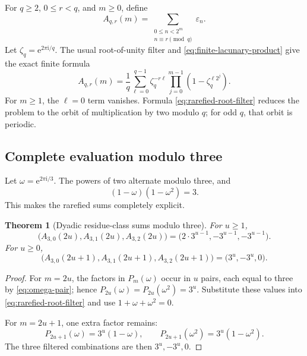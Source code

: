 \documentclass[11pt,oneside]{article}
\newtheorem{theorem}{Theorem}[section]
\theoremstyle{definition}
\theoremstyle{remark}
\newcommand{\e}{\mathrm e}
\newcommand{\ii}{\mathrm i}
\newcommand{\eps}{\varepsilon}
\begin{document}
For \(q\ge2\), \(0\le r<q\), and \(m\ge0\), define
\begin{equation}
  A_{q,r}(m)=\sum_{\substack{0\le n<2^m\\n\equiv r\pmod q}}\eps_n.             \label{eq:rarefied-def}
\end{equation}
Let \(\zeta_q=\e^{2\pi\ii/q}\).  The usual root-of-unity filter and
\eqref{eq:finite-lacunary-product} give the exact finite formula
\begin{equation}
  \boxed{
  A_{q,r}(m)=\frac1q\sum_{\ell=0}^{q-1}\zeta_q^{-r\ell}
   \prod_{j=0}^{m-1}\left(1-\zeta_q^{\ell2^j}\right).}      \label{eq:rarefied-root-filter}
\end{equation}
For \(m\ge1\), the \(\ell=0\) term vanishes.  Formula
\eqref{eq:rarefied-root-filter} reduces the problem to the orbit of multiplication by two
modulo \(q\); for odd \(q\), that orbit is periodic.

\subsection{Complete evaluation modulo three}

Let \(\omega=\e^{2\pi\ii/3}\).  The powers of two alternate modulo three, and
\begin{equation}
  (1-\omega)(1-\omega^2)=3.                                \label{eq:omega-pair}
\end{equation}
This makes the rarefied sums completely explicit.

\begin{theorem}[Dyadic residue-class sums modulo three]
\label{thm:mod3-rarefied}
For \(u\ge1\),
\begin{equation}
  \boxed{
  \bigl(A_{3,0}(2u),A_{3,1}(2u),A_{3,2}(2u)\bigr)
   =\bigl(2\cdot3^{u-1},-3^{u-1},-3^{u-1}\bigr).}          \label{eq:mod3-even-level}
\end{equation}
For \(u\ge0\),
\begin{equation}
  \boxed{
  \bigl(A_{3,0}(2u+1),A_{3,1}(2u+1),A_{3,2}(2u+1)\bigr)
   =\bigl(3^u,-3^u,0\bigr).}                               \label{eq:mod3-odd-level}
\end{equation}
\end{theorem}

\begin{proof}
For \(m=2u\), the factors in \(P_m(\omega)\) occur in \(u\) pairs, each equal to three by
\eqref{eq:omega-pair}; hence
\(P_{2u}(\omega)=P_{2u}(\omega^2)=3^u\).  Substitute these values into
\eqref{eq:rarefied-root-filter} and use \(1+\omega+\omega^2=0\).

For \(m=2u+1\), one extra factor remains:
\[
  P_{2u+1}(\omega)=3^u(1-\omega),
  \qquad
  P_{2u+1}(\omega^2)=3^u(1-\omega^2).
\]
The three filtered combinations are then \(3^u,-3^u,0\).
\end{proof}
\end{document}

